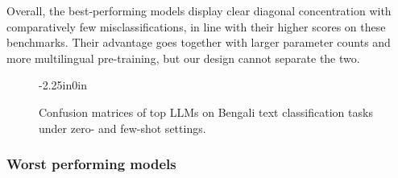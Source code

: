 \documentclass[10pt,letterpaper]{article}
\begin{document}
Overall, the best-performing models display clear diagonal concentration with comparatively few misclassifications, in line with their higher scores on these benchmarks. Their advantage goes together with larger parameter counts and more multilingual pre-training, but our design cannot separate the two.

\begin{figure}[!t]
\begin{adjustwidth}{-2.25in}{0in}
\centering

\hfill
{}
\hfill
{}

\vspace{0.3cm}

\hfill
{}
\hfill
{}

\vspace{0.3cm}


\caption{Confusion matrices of top LLMs on Bengali text classification tasks under zero- and few-shot settings.}
\label{fig:confusion_matrices_best}
\end{adjustwidth}
\end{figure}


\subsubsection*{Worst performing models}
\label{sec:worst_performing_models}
\end{document}
